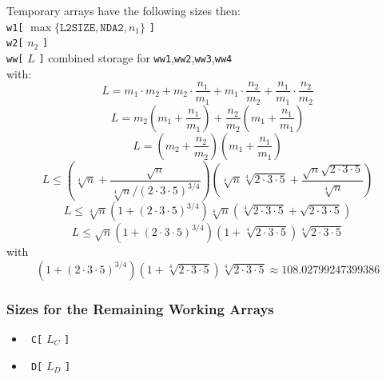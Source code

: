 \documentclass[twocolumn]{article}
\begin{document}
Temporary arrays have the following sizes then: \\
\texttt{w1[} $\max\{\texttt{L2SIZE}, \texttt{NDA2}, n_1\}$ \texttt{]} \\
\texttt{w2[} $n_2$ \texttt{]} \\
\texttt{ww[} $L$ \texttt{]} combined storage for \texttt{ww1},\texttt{ww2},\texttt{ww3},\texttt{ww4} \\
with:
\[ L = m_1\cdot m_2 + m_2\cdot \frac{n_1}{m_1} + m_1\cdot\frac{n_2}{m_2} + \frac{n_1}{m_1}\cdot\frac{n_2}{m_2}\]
\[ L = m_2\left(m_1+\frac{n_1}{m_1}\right) + \frac{n_2}{m_2}\left(m_1 + \frac{n_1}{m_1}\right)\]
\[ L = \left(m_2 + \frac{n_2}{m_2}\right)\left(m_1+\frac{n_1}{m_1}\right) \]
\[ L \le \left( \sqrt[4]{n} + \frac{\sqrt{n}}{\sqrt[4]{n}/(2\cdot3\cdot5)^{3/4}} \right)
        \left( \sqrt[4]{n}\sqrt[4]{2\cdot3\cdot5} + \frac{\sqrt{n}\sqrt{2\cdot3\cdot5}}{\sqrt[4]{n}} \right) \]
\[ L \le \sqrt[4]{n} \left( 1 + (2\cdot3\cdot5)^{3/4} \right) \sqrt[4]{n} \left( \sqrt[4]{2\cdot3\cdot5} + \sqrt{2\cdot3\cdot5}\right) \]
\[ L \le \sqrt{n} \left( 1 + (2\cdot3\cdot5)^{3/4} \right) \left( 1 + \sqrt[4]{2\cdot3\cdot5}\right) \sqrt[4]{2\cdot3\cdot5} \]
with
\[ \left( 1 + (2\cdot3\cdot5)^{3/4} \right) \left( 1 + \sqrt[4]{2\cdot3\cdot5}\right) \sqrt[4]{2\cdot3\cdot5} \approx 108.02799247399386 \]

\subsubsection{Sizes for the Remaining Working Arrays}

\begin{itemize}
\item \texttt{\mbox{ }C[} $L_C$ \texttt{]}
\item \texttt{\mbox{ }D[} $L_D$ \texttt{]}
\end{itemize}
\end{document}
